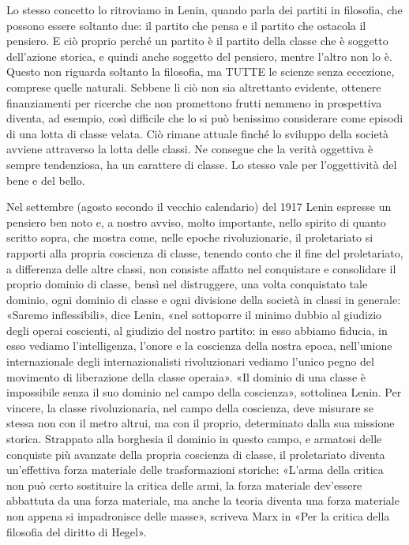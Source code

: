 \documentclass[../main]{subfiles}
\begin{document}
Lo stesso concetto lo ritroviamo in Lenin, quando parla dei partiti in filosofia, che possono essere soltanto due: il partito che pensa e il partito che ostacola il pensiero. E ciò proprio perché un partito è il partito della classe che è soggetto dell'azione storica, e quindi anche soggetto del pensiero, mentre l'altro non lo è. Questo non riguarda soltanto la filosofia, ma TUTTE le scienze senza eccezione, comprese quelle naturali. Sebbene lì ciò non sia altrettanto evidente, ottenere finanziamenti per ricerche che non promettono frutti nemmeno in prospettiva diventa, ad esempio, così difficile che lo si può benissimo considerare come episodi di una lotta di classe velata. Ciò rimane attuale finché lo sviluppo della società avviene attraverso la lotta delle classi. Ne consegue che la verità oggettiva è sempre tendenziosa, ha un carattere di classe. Lo stesso vale per l'oggettività del bene e del bello.

Nel settembre (agosto secondo il vecchio calendario) del 1917 Lenin espresse un pensiero ben noto e, a nostro avviso, molto importante, nello spirito di quanto scritto sopra, che mostra come, nelle epoche rivoluzionarie, il proletariato si rapporti alla propria coscienza di classe, tenendo conto che il fine del proletariato, a differenza delle altre classi, non consiste affatto nel conquistare e consolidare il proprio dominio di classe, bensì nel distruggere, una volta conquistato tale dominio, ogni dominio di classe e ogni divisione della società in classi in generale: «Saremo inflessibili», dice Lenin, «nel sottoporre il minimo dubbio al giudizio degli operai coscienti, al giudizio del nostro partito: in esso abbiamo fiducia, in esso vediamo l'intelligenza, l'onore e la coscienza della nostra epoca, nell'unione internazionale degli internazionalisti rivoluzionari vediamo l'unico pegno del movimento di liberazione della classe operaia». «Il dominio di una classe è impossibile senza il suo dominio nel campo della coscienza», sottolinea Lenin. Per vincere, la classe rivoluzionaria, nel campo della coscienza, deve misurare se stessa non con il metro altrui, ma con il proprio, determinato dalla sua missione storica. Strappato alla borghesia il dominio in questo campo, e armatosi delle conquiste più avanzate della propria coscienza di classe, il proletariato diventa un'effettiva forza materiale delle trasformazioni storiche: «L'arma della critica non può certo sostituire la critica delle armi, la forza materiale dev'essere abbattuta da una forza materiale, ma anche la teoria diventa una forza materiale non appena si impadronisce delle masse», scriveva Marx in «Per la critica della filosofia del diritto di Hegel».
\end{document}
